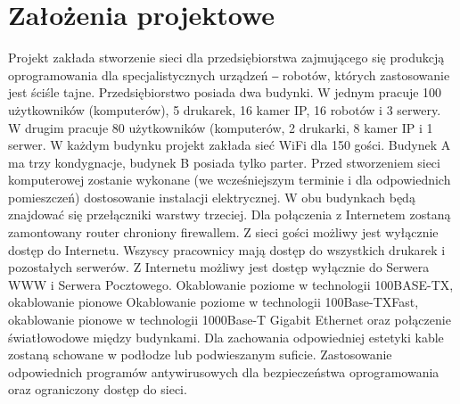 \documentclass{article}
\begin{document}
\section{Założenia projektowe}
Projekt zakłada stworzenie sieci dla przedsiębiorstwa zajmującego się produkcją oprogramowania dla specjalistycznych urządzeń ‒ robotów, których zastosowanie jest ściśle tajne. Przedsiębiorstwo posiada dwa budynki. W jednym pracuje 100 użytkowników (komputerów), 5 drukarek, 16 kamer IP, 16 robotów i 3 serwery. W drugim pracuje 80 użytkowników (komputerów, 2 drukarki, 8 kamer IP i 1 serwer. W każdym budynku projekt zakłada sieć WiFi dla 150 gości. Budynek A ma trzy kondygnacje, budynek B posiada tylko parter. Przed stworzeniem sieci komputerowej zostanie wykonane (we wcześniejszym terminie i dla odpowiednich pomieszczeń) dostosowanie instalacji elektrycznej.
W obu budynkach będą znajdować się przełączniki warstwy trzeciej.
Dla połączenia z Internetem zostaną zamontowany router chroniony firewallem.
Z sieci gości możliwy jest wyłącznie dostęp do Internetu.
Wszyscy pracownicy mają dostęp do wszystkich drukarek i pozostałych serwerów. Z Internetu możliwy jest dostęp wyłącznie do Serwera WWW i Serwera Pocztowego.
Okablowanie poziome w technologii 100BASE-TX, okablowanie pionowe
Okablowanie poziome w technologii 100Base-TXFast, okablowanie pionowe w technologii 1000Base-T Gigabit Ethernet oraz połączenie światłowodowe między budynkami. Dla zachowania odpowiedniej estetyki kable zostaną schowane w podłodze lub podwieszanym suficie.
Zastosowanie odpowiednich programów antywirusowych dla bezpieczeństwa oprogramowania oraz ograniczony dostęp do sieci.
\end{document}
